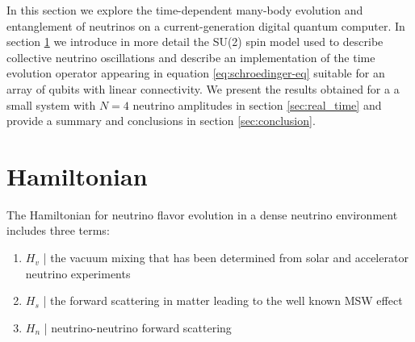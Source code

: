 \documentclass[10pt]{article}
\begin{document}
In this section we explore the time-dependent many-body evolution and entanglement of neutrinos on a current-generation digital quantum computer. In section \ref{sec:spin_model} we introduce in more detail the SU(2) spin model used to describe collective neutrino oscillations and describe an implementation of the time evolution operator appearing in equation \eqref{eq:schroedinger-eq} suitable for an array of qubits with linear connectivity. We present the results obtained for a a small system with $N=4$ neutrino amplitudes in section \ref{sec:real_time} and provide a summary and conclusions in section \ref{sec:conclusion}.

\section{Hamiltonian}
\label{sec:spin_model}

The Hamiltonian for neutrino flavor evolution in a dense neutrino environment includes three terms: 
\begin{enumerate}
    \item $H_v$ | the vacuum mixing that has been determined from solar and accelerator neutrino experiments~\cite{GonzalezGarcia:2003}
    \item $H_s$ | the forward scattering in matter leading to the well known MSW effect~\cite{Wolfenstein:1977ue,Mikheev:1986gs}
    \item $H_n$ | neutrino-neutrino forward scattering
\end{enumerate}
\end{document}
